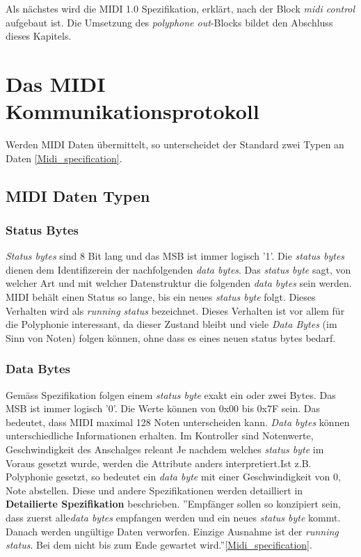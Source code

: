 Als nächstes wird die MIDI 1.0 Spezifikation, erklärt, nach der Block \textit{midi control} aufgebaut ist. Die Umsetzung des \textit{polyphone out}-Blocks bildet den Abschluss dieses Kapitels.\\


\newpage
\section{Das MIDI Kommunikationsprotokoll}\label{sect.midi_spezification}
Werden MIDI Daten übermittelt, so unterscheidet der Standard zwei Typen an Daten \ref{Midi_specification}.

\subsection{MIDI Daten Typen}\label{datenytpen}
\subsubsection*{Status Bytes}
\textit{Status bytes} sind 8 Bit lang und das MSB ist immer logisch '1'. Die \textit{status bytes} dienen dem Identifizerein der nachfolgenden \textit{data bytes}. Das \textit{status byte} sagt, von welcher Art und mit welcher Datenstruktur die folgenden \textit{data bytes} sein werden.
\newline
\newline
MIDI behält einen Status so lange, bis ein neues \textit{status byte} folgt. Dieses Verhalten wird als \textit{running status} bezeichnet. Dieses Verhalten ist vor allem für die Polyphonie interessant, da dieser Zustand bleibt und viele \textit{Data Bytes} (im Sinn von Noten) folgen können, ohne dass es eines neuen status bytes bedarf.

\subsubsection*{Data Bytes}
Gemäss Spezifikation folgen einem \textit{status byte} exakt ein oder zwei Bytes. Das MSB ist immer logisch '0'. Die Werte können von 0x00 bis 0x7F sein. Das bedeutet, dass MIDI maximal 128 Noten unterscheiden kann.
\newline
\newline
\textit{Data bytes} können unterschiedliche Informationen erhalten. Im Kontroller sind Notenwerte, Geschwindigkeit des Anschalges releant
\newline
\newline
Je nachdem welches \textit{status byte} im Voraus gesetzt wurde, werden die Attribute anders interpretiert.Ist z.B. Polyphonie gesetzt, so bedeutet ein \textit{data byte} mit einer Geschwindigkeit von 0, Note abstellen. Diese und andere Spezifikationen werden detailliert in \textbf{Detailierte Spezifikation} beschrieben.
\newline
\newline
''Empfänger sollen so konzipiert sein, dass zuerst alle\textit{data bytes} empfangen werden und ein neues \textit{status byte} kommt. Danach werden ungültige Daten verworfen. Einzige Ausnahme ist der \textit{running status}. Bei dem nicht bis zum Ende gewartet wird.''\ref{Midi_specification}.\\

